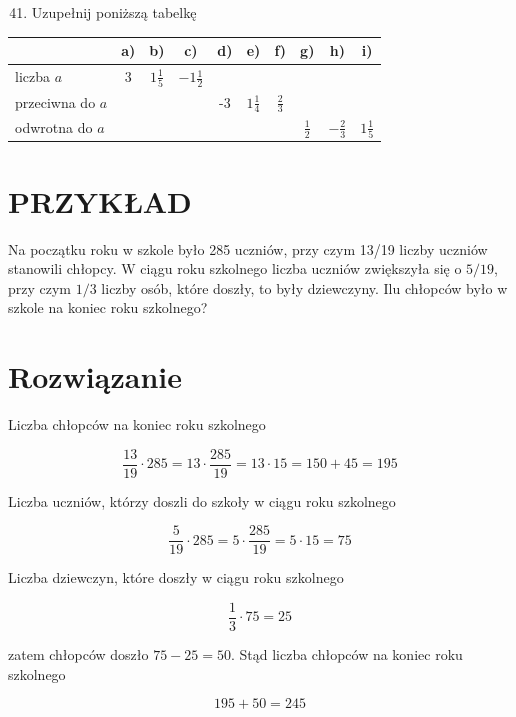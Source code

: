\documentclass[10pt]{article}
\begin{document}
\begin{enumerate}
  \setcounter{enumi}{40}
  \item Uzupełnij poniższą tabelkę
\end{enumerate}

\begin{center}
\begin{tabular}{|l|c|c|c|c|c|c|c|c|c|}
\hline
 & a) & b) & c) & d) & e) & f) & g) & h) & i) \\
\hline
liczba \(a\) & 3 & \(1 \frac{1}{5}\) & \(-1 \frac{1}{2}\) &  &  &  &  &  &  \\
\hline
przeciwna do \(a\) &  &  &  & -3 & \(1 \frac{1}{4}\) & \(\frac{2}{3}\) &  &  &  \\
\hline
odwrotna do \(a\) &  &  &  &  &  &  & \(\frac{1}{2}\) & \(-\frac{2}{3}\) & \(1 \frac{1}{5}\) \\
\hline
\end{tabular}
\end{center}

\section*{PRZYKŁAD}
Na początku roku w szkole było 285 uczniów, przy czym 13/19 liczby uczniów stanowili chłopcy. W ciągu roku szkolnego liczba uczniów zwiększyła się o \(5 / 19\), przy czym \(1 / 3\) liczby osób, które doszły, to były dziewczyny. Ilu chłopców było w szkole na koniec roku szkolnego?

\section*{Rozwiązanie}
Liczba chłopców na koniec roku szkolnego

\[
\frac{13}{19} \cdot 285=13 \cdot \frac{285}{19}=13 \cdot 15=150+45=195
\]

Liczba uczniów, którzy doszli do szkoły w ciągu roku szkolnego

\[
\frac{5}{19} \cdot 285=5 \cdot \frac{285}{19}=5 \cdot 15=75
\]

Liczba dziewczyn, które doszły w ciągu roku szkolnego

\[
\frac{1}{3} \cdot 75=25
\]

zatem chłopców doszło \(75-25=50\). Stąd liczba chłopców na koniec roku szkolnego

\[
195+50=245
\]
\end{document}
